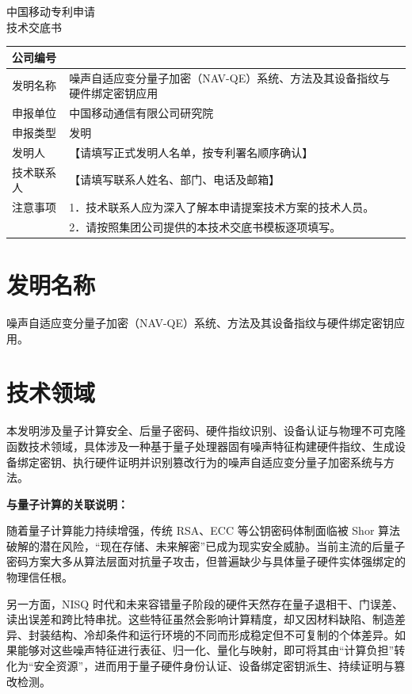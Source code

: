 \documentclass[12pt,a4paper]{article}
\begin{document}
\begin{center}
    {\Large\heiti 中国移动专利申请} \\[1em]
    {\Huge\heiti 技术交底书} \\[1em]
\end{center}

\noindent
\begin{tabular}{|p{3cm}|p{12cm}|}
\hline
公司编号 &  \\
\hline
发明名称 & 噪声自适应变分量子加密（NAV-QE）系统、方法及其设备指纹与硬件绑定密钥应用 \\
\hline
申报单位 & 中国移动通信有限公司研究院 \\
\hline
申报类型 & 发明 \\
\hline
发明人 & 【请填写正式发明人名单，按专利署名顺序确认】 \\
\hline
技术联系人 & 【请填写联系人姓名、部门、电话及邮箱】 \\
\hline
注意事项 & 1．技术联系人应为深入了解本申请提案技术方案的技术人员。 \\
         & 2．请按照集团公司提供的本技术交底书模板逐项填写。 \\
\hline
\end{tabular}

\vspace{1cm}

\section{发明名称}

噪声自适应变分量子加密（NAV-QE）系统、方法及其设备指纹与硬件绑定密钥应用。

\section{技术领域}

本发明涉及量子计算安全、后量子密码、硬件指纹识别、设备认证与物理不可克隆函数技术领域，具体涉及一种基于量子处理器固有噪声特征构建硬件指纹、生成设备绑定密钥、执行硬件证明并识别篡改行为的噪声自适应变分量子加密系统与方法。

\textbf{与量子计算的关联说明：}

随着量子计算能力持续增强，传统 RSA、ECC 等公钥密码体制面临被 Shor 算法破解的潜在风险，“现在存储、未来解密”已成为现实安全威胁。当前主流的后量子密码方案大多从算法层面对抗量子攻击，但普遍缺少与具体量子硬件实体强绑定的物理信任根。

另一方面，NISQ 时代和未来容错量子阶段的硬件天然存在量子退相干、门误差、读出误差和跨比特串扰。这些特征虽然会影响计算精度，却又因材料缺陷、制造差异、封装结构、冷却条件和运行环境的不同而形成稳定但不可复制的个体差异。如果能够对这些噪声特征进行表征、归一化、量化与映射，即可将其由“计算负担”转化为“安全资源”，进而用于量子硬件身份认证、设备绑定密钥派生、持续证明与篡改检测。
\end{document}
